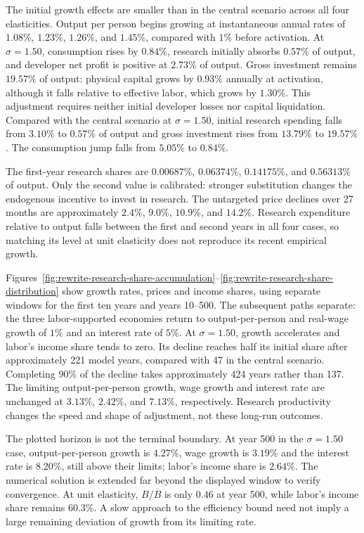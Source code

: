 The initial growth effects are smaller than in the central scenario across
all four elasticities.
Output per person begins growing at instantaneous annual rates of
$1.08\%$, $1.23\%$, $1.26\%$, and $1.45\%$, compared with $1\%$ before
activation. At $\sigma=1.50$, consumption rises by $0.84\%$, research
initially absorbs $0.57\%$ of output, and developer net profit is positive
at $2.73\%$ of output. Gross investment remains $19.57\%$ of output:
physical capital grows by $0.93\%$ annually at activation, although it
falls relative to effective labor, which grows by $1.30\%$.
This adjustment requires neither initial developer losses nor capital
liquidation. Compared with the central scenario at $\sigma=1.50$, initial
research spending falls from $3.10\%$ to $0.57\%$ of output and gross
investment rises from $13.79\%$ to $19.57\%$. The consumption jump falls
from $5.05\%$ to $0.84\%$.

The first-year research shares are $0.00687\%$, $0.06374\%$, $0.14175\%$,
and $0.56313\%$ of output. Only the second value is calibrated: stronger
substitution changes the endogenous incentive to invest in research.
The untargeted price declines over 27 months are approximately $2.4\%$,
$9.0\%$, $10.9\%$, and $14.2\%$. Research expenditure relative to output
falls between the first and second years in all four cases, so matching
its level at unit elasticity does not reproduce its recent empirical growth.

Figures~\ref{fig:rewrite-research-share-accumulation}--\ref{fig:rewrite-research-share-distribution}
show growth rates, prices and income shares, using separate windows for
the first ten years and years 10--500. The subsequent paths separate:
the three labor-supported economies return to output-per-person and
real-wage growth of $1\%$ and an interest rate of $5\%$. At $\sigma=1.50$,
growth accelerates and labor's income share tends to zero. Its decline
reaches half its initial share after approximately 221 model years, compared
with 47 in the central scenario. Completing $90\%$ of the decline takes
approximately 424 years rather than 137.
The limiting output-per-person growth, wage growth and interest rate
are unchanged at $3.13\%$, $2.42\%$, and $7.13\%$, respectively. Research
productivity changes the speed and shape of adjustment, not these long-run
outcomes.

The plotted horizon is not the terminal boundary. At year 500 in the
$\sigma=1.50$ case, output-per-person growth is $4.27\%$, wage growth is
$3.19\%$ and the interest rate is $8.20\%$, still above their limits;
labor's income share is $2.64\%$. The numerical solution is extended far
beyond the displayed window to verify convergence. At unit elasticity,
$B/\overline B$ is only $0.46$ at year 500, while labor's income share
remains $60.3\%$. A slow approach to the efficiency bound need not imply
a large remaining deviation of growth from its limiting rate.

